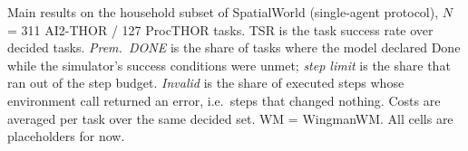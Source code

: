 \documentclass[10pt,twocolumn]{article}
\begin{document}

\begin{table}[t]
\centering
\caption{Main results on the household subset of SpatialWorld (single-agent protocol), $N$ = 311 AI2-THOR / 127 ProcTHOR tasks. TSR is the task success rate over decided tasks. \emph{Prem.\ DONE} is the share of tasks where the model declared Done while the simulator's success conditions were unmet; \emph{step limit} is the share that ran out of the step budget. \emph{Invalid} is the share of executed steps whose environment call returned an error, i.e.\ steps that changed nothing. Costs are averaged per task over the same decided set. WM = WingmanWM. All cells are placeholders for now.}
\label{tab:main-results-v2}
\sbox{\mainbox}{}
\ifdim\wd\mainbox>\textwidth
  \typeout{===VERDICT=TOO-WIDE}
\else
  \typeout{===VERDICT=FITS}
\fi
\usebox{\mainbox}
\end{table}
\end{document}
